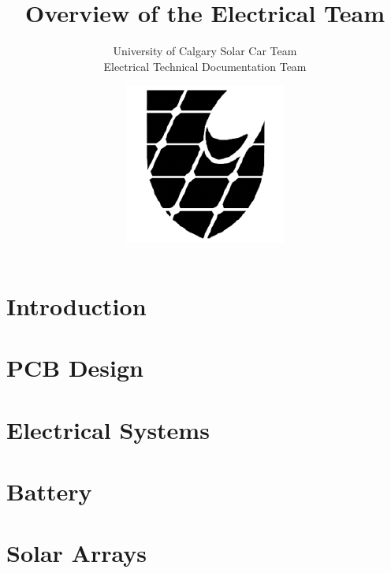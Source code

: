 \documentclass[titlepage]{article}
\title{Overview of the Electrical Team}
\author{University of Calgary Solar Car Team\\
        Electrical Technical Documentation Team}
\date{\includegraphics{images/logo.png}}
\begin{document}
    \maketitle

    \section{Introduction}
    \section{PCB Design}
    \section{Electrical Systems}
    \section{Battery}
    \section{Solar Arrays}
\end{document}
